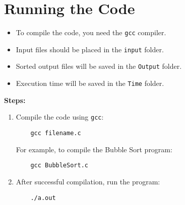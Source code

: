 \documentclass{article}
\begin{document}
\section*{Running the Code}

\begin{itemize}[label=--]
    \item To compile the code, you need the \texttt{gcc} compiler.
    \item Input files should be placed in the \texttt{input} folder.
    \item Sorted output files will be saved in the \texttt{Output} folder.
    \item Execution time will be saved in the \texttt{Time} folder.
\end{itemize}

\noindent\textbf{Steps:}

\begin{enumerate}
    \item Compile the code using \texttt{gcc}:
    \begin{verbatim}
    gcc filename.c
    \end{verbatim}
    For example, to compile the Bubble Sort program:
    \begin{verbatim}
    gcc BubbleSort.c
    \end{verbatim}

    \item After successful compilation, run the program:
    \begin{verbatim}
    ./a.out
    \end{verbatim}
\end{enumerate}
\end{document}
